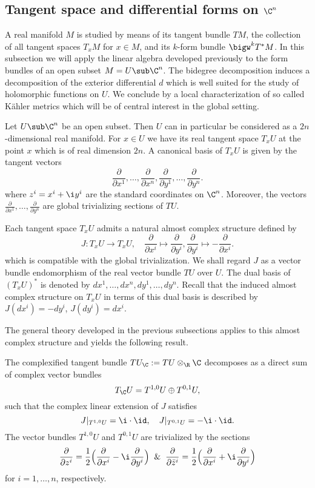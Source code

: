 \subsection{Tangent space and differential forms on \texorpdfstring{$\C^n$}{C}}
A real manifold $M$ is studied by means of its tangent bundle $TM$, the collection of all tangent spaces $T_xM$ for $x\in M$, and its $k$-form bundle $\bigw^kT^*M$. In this subsection we will apply the linear algebra developed previously to the form bundles of an open subset $M=U\sub\C^n$. The bidegree decomposition induces a decomposition of the exterior differential $d$ which is well suited for the study of holomorphic functions on $U$. We conclude by a local characterization of so called K\"ahler metrics which will be of central interest in the global setting.\par
Let $U\sub\C^n$ be an open subset. Then $U$ can in particular be considered as a $2n$-dimensional real manifold. For $x\in U$ we have its real tangent space $T_xU$ at the point $x$ which is of real dimension $2n$. A canonical basis of $T_xU$ is given by the tangent vectors
\[\frac{\partial}{\partial x^1},\dots,\frac{\partial}{\partial x^n},\frac{\partial}{\partial y^1},\dots,\frac{\partial}{\partial y^n}.\]
where $z^i=x^i+\i y^i$ are the standard coordinates on $\C^n$. Moreover, the vectors $\frac{\partial}{\partial x^1},\dots,\frac{\partial}{\partial y^n}$ are global trivializing sections of $TU$.\par
Each tangent space $T_xU$ admits a natural almost complex structure defined by
\[J:T_xU\to T_xU,\quad\frac{\partial}{\partial x^i}\mapsto\frac{\partial}{\partial y^i},\frac{\partial}{\partial y^i}\mapsto-\frac{\partial}{\partial x^i}.\]
which is compatible with the global trivialization. We shall regard $J$ as a vector bundle endomorphism of the real vector bundle $TU$ over $U$. The dual basis of $(T_xU)^*$ is denoted by $dx^1,\dots,dx^n,dy^1,\dots,dy^n$. Recall that the induced almost complex structure on $T_xU$ in terms of this dual basis is described by $J(dx^i)=-dy^i$, $J(dy^i)=dx^i$.\par
The general theory developed in the previous subsections applies to this almost complex structure and yields the following result.
\begin{proposition}
The complexified tangent bundle $TU_{\C}:=TU\otimes_{\R}\C$ decomposes as a direct sum of complex vector bundles
\[T_{\C}U=T^{1,0}U\oplus T^{0,1}U,\]
such that the complex linear extension of $J$ satisfies
\[J|_{T^{1,0}U}=\i\cdot\id,\quad J|_{T^{0,1}U}=-\i\cdot\id.\]
The vector bundles $T^{1,0}U$ and $T^{0,1}U$ are trivialized by the sections
\[\frac{\partial}{\partial z^i}=\frac{1}{2}\Big(\frac{\partial}{\partial x^i}-\i\frac{\partial}{\partial y^i}\Big)\And\frac{\partial}{\partial\bar{z}^i}=\frac{1}{2}\Big(\frac{\partial}{\partial x^i}+\i\frac{\partial}{\partial y^i}\Big)\]
for $i=1,\dots,n$, respectively.
\end{proposition}
